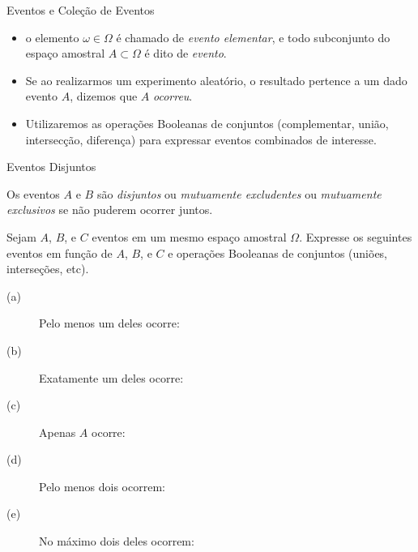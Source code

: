 \begin{frame}

\begin{block}{Eventos e Coleção de Eventos}
\begin{itemize}
\item  o elemento $\omega \in \Omega$ é chamado de
{\it evento elementar}, e todo subconjunto do espaço amostral  $A\subset\Omega$ é dito de  {\it evento}.
%		
%		
\item Se ao
realizarmos um experimento aleatório, o resultado pertence a um dado
evento $A$, dizemos que $A$ {\em ocorreu}.

\item Utilizaremos as operações Booleanas de conjuntos (complementar,
união, intersecção, diferença) para expressar eventos combinados de
interesse.

\end{itemize}

\end{block}


\begin{block}{Eventos Disjuntos}

Os eventos $A$ e $B$ s\~ao {\em disjuntos} ou {\em mutuamente excludentes}
ou {\em mutuamente exclusivos} se n\~ao puderem ocorrer juntos.
\end{block}


\begin{exer}
Sejam $A$, $B$, e $C$ eventos em um mesmo espaço amostral $\Omega$.
Expresse os seguintes eventos em função de $A$,
$B$, e $C$ e operações Booleanas de conjuntos (uniões, interseções, etc).
\begin{description}
\item[(a)] Pelo menos um deles ocorre:
\item[(b)] Exatamente um deles ocorre:
\item[(c)] Apenas $A$ ocorre:
\item[(d)] Pelo menos dois ocorrem:
\item[(e)] No m\'aximo dois deles ocorrem:
\end{description}
\end{exer}

\end{frame}
